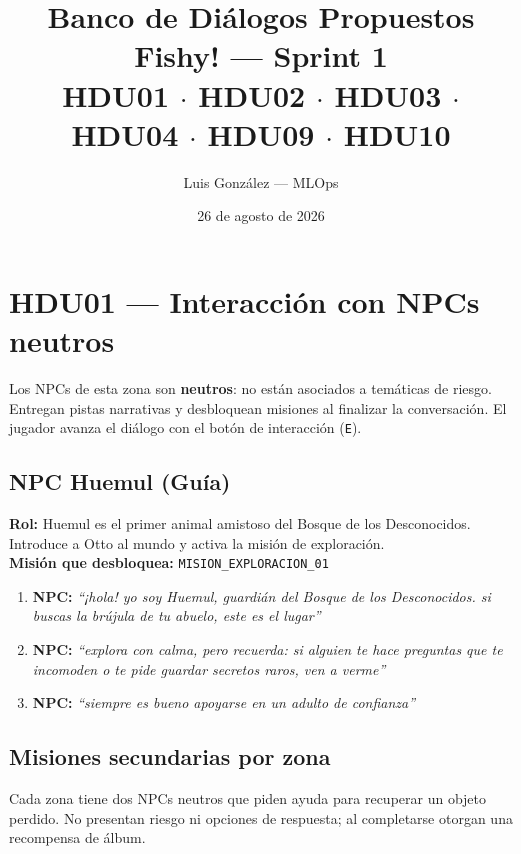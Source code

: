 \documentclass[12pt,a4paper]{article}
\title{\textbf{Banco de Diálogos Propuestos}\\[0.3em]
       \large Fishy! --- Sprint 1\\[0.2em]
       \normalsize HDU01 $\cdot$ HDU02 $\cdot$ HDU03 $\cdot$ HDU04 $\cdot$ HDU09 $\cdot$ HDU10}
\author{Luis González --- MLOps}
\date{26 de agosto de 2026}
\newcommand{\npcmsg}[1]{\textcolor{npccolor}{\textbf{NPC:}} \textit{``#1''}}
\begin{document}
\maketitle
\tableofcontents
\newpage

\section{HDU01 --- Interacción con NPCs neutros}

Los NPCs de esta zona son \textbf{neutros}: no están asociados a temáticas de riesgo.
Entregan pistas narrativas y desbloquean misiones al finalizar la conversación.
El jugador avanza el diálogo con el botón de interacción (\texttt{E}).

\subsection{NPC Huemul (Guía)}

\textbf{Rol:} Huemul es el primer animal amistoso del Bosque de los Desconocidos. Introduce a Otto al mundo y activa la misión de exploración.\\
\textbf{Misión que desbloquea:} \texttt{MISION\_EXPLORACION\_01}

\begin{enumerate}[label=\textbf{Línea \arabic*.}]
  \item \npcmsg{¡hola! yo soy Huemul, guardián del Bosque de los Desconocidos. si buscas la brújula de tu abuelo, este es el lugar}
  \item \npcmsg{explora con calma, pero recuerda: si alguien te hace preguntas que te incomoden o te pide guardar secretos raros, ven a verme}
  \item \npcmsg{siempre es bueno apoyarse en un adulto de confianza}
\end{enumerate}

\subsection{Misiones secundarias por zona}

Cada zona tiene dos NPCs neutros que piden ayuda para recuperar un objeto perdido. No presentan riesgo ni opciones de respuesta; al completarse otorgan una recompensa de álbum.
\end{document}
